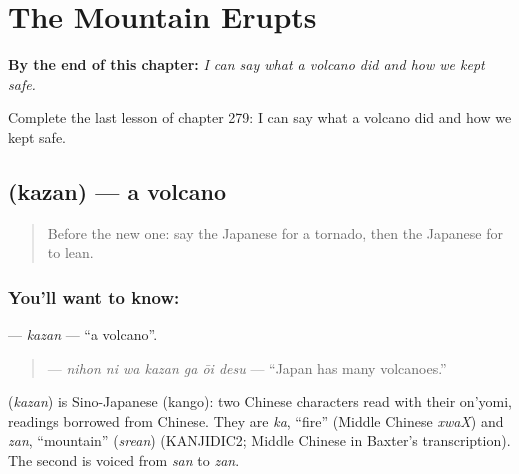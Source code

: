 
\chapter{The Mountain Erupts}
\label{ch:ja-the-mountain-erupts}

\begin{chapteropening}
\textbf{By the end of this chapter:} \emph{I can say what a volcano did and how we kept safe.}

Complete the last lesson of chapter 279: I can say what a volcano did and how we kept safe.
\end{chapteropening}

\section[\texorpdfstring{\ja{かざん} (kazan)}{かざん (kazan)}]{ (kazan) — a volcano}

\label{lesson:JA-C279-kazan}



\begin{quote}
Before the new one: say the Japanese for a tornado, then the Japanese for to lean.
\end{quote}

\subsection*{You'll want to know: }
\textbf{} — \emph{kazan} — \textquotedblleft{}a volcano\textquotedblright{}.

\begin{quote}
\textbf{  } — \emph{nihon ni wa kazan ga ōi desu} — \textquotedblleft{}Japan has many volcanoes.\textquotedblright{}
\end{quote}

\begin{cousinweb}
\textbf{} (\emph{kazan}) is Sino-Japanese (kango): two Chinese characters read with their on'yomi, readings borrowed from Chinese. They are \emph{ka}, \textquotedblleft{}fire\textquotedblright{} (Middle Chinese \emph{xwaX}) and \emph{zan}, \textquotedblleft{}mountain\textquotedblright{} (\emph{srean}) (KANJIDIC2; Middle Chinese in Baxter's transcription). The second is voiced from \emph{san} to \emph{zan}.
\end{cousinweb}

